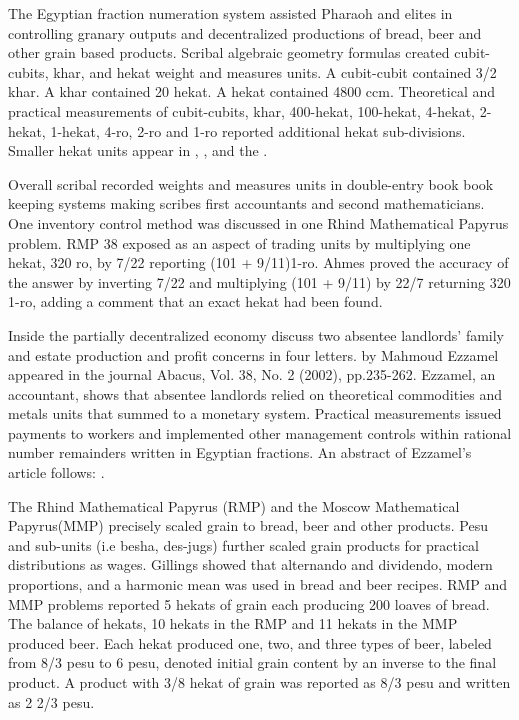 \documentclass[12pt]{article}
\begin{document}
The Egyptian fraction numeration system assisted Pharaoh and elites in controlling granary outputs and decentralized productions of bread, beer and other grain based products. Scribal algebraic geometry formulas created cubit-cubits, khar, and hekat weight and measures units. A cubit-cubit contained 3/2 khar. A khar contained 20 hekat. A hekat contained 4800 ccm. Theoretical and practical measurements of cubit-cubits, khar, 400-hekat, 100-hekat, 4-hekat, 2-hekat, 1-hekat, 4-ro, 2-ro and 1-ro reported additional hekat sub-divisions. Smaller hekat units appear in , , and the . 

Overall scribal recorded weights and measures units in double-entry book book keeping systems making scribes first accountants and second mathematicians. One inventory control method was discussed in one Rhind Mathematical Papyrus problem. RMP 38 exposed as an aspect of trading units by multiplying one hekat, 320 ro, by 7/22 reporting (101 + 9/11)1-ro. Ahmes proved the accuracy of the answer by inverting 7/22 and multiplying (101 + 9/11) by 22/7 returning 320 1-ro, adding a comment that an exact hekat had been found.

Inside the partially decentralized economy  discuss two absentee landlords' family and estate production and profit concerns in four letters.  by Mahmoud Ezzamel appeared in the journal Abacus, Vol. 38, No. 2 (2002), pp.235-262. Ezzamel, an accountant, shows that absentee landlords relied on theoretical commodities and metals units that summed to a monetary system. Practical measurements issued payments to workers and implemented other management controls within rational number remainders written in Egyptian fractions. An abstract of Ezzamel's article follows: .

The Rhind Mathematical Papyrus (RMP) and the Moscow Mathematical Papyrus(MMP) precisely scaled grain to bread, beer and other products. Pesu and sub-units (i.e besha, des-jugs) further scaled grain products for practical distributions as wages. Gillings showed that alternando and dividendo, modern proportions, and a harmonic mean was used in bread and beer recipes. RMP and MMP problems reported 5 hekats of grain each producing 200 loaves of bread. The balance of hekats, 10 hekats in the RMP and 11 hekats in the MMP produced beer. Each hekat produced one, two, and three types of beer, labeled from 8/3 pesu to 6 pesu, denoted initial grain content by an inverse to the final product. A product with 3/8 hekat of grain was reported as 8/3 pesu and written as 2 2/3 pesu. 
\end{document}
